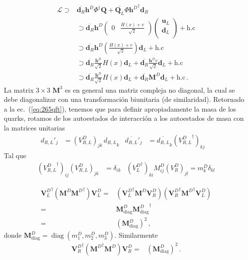 \begin{frame}
\begin{align}
  \mathcal{L}\supset&\overline{\mathbf{d}_R} \mathbf{h}^D \Phi^\dagger \mathbf{Q}+\overline{\mathbf{Q}_L}\Phi{\mathbf{h}^{D}}^\dagger  \mathbf{d}_R\nonumber\\
  &\supset\overline{\mathbf{d}_R} \mathbf{h}^D
  \begin{pmatrix}
    0 &
    \frac{H(x)+v}{\sqrt{2}}
  \end{pmatrix}
  \begin{pmatrix}
    \mathbf{u}_L\\
    \mathbf{d}_L\\
  \end{pmatrix}
  +\text{h.c}\nonumber\\
  &\supset\overline{\mathbf{d}_R} \mathbf{h}^D
  \left(\frac{H(x)+v}{\sqrt{2}}\right)\mathbf{d}_L
  +\text{h.c}\nonumber\\
  &\supset\overline{\mathbf{d}_R} \frac{\mathbf{h}^D}{\sqrt{2}}H(x)\mathbf{d}_L
  +\overline{\mathbf{d}_R} \frac{\mathbf{h}^Dv}{\sqrt{2}}\mathbf{d}_L
      +\text{h.c}\nonumber\\
  &\supset\overline{\mathbf{d}_R} \frac{\mathbf{h}^D}{\sqrt{2}}H(x)\mathbf{d}_L
  +\overline{\mathbf{d}_R} \mathbf{M}^D\mathbf{d}_L
      +\text{h.c}\,.
\end{align}
La matrix $3\times 3$ $\mathbf{M}^3$ es en general una matriz compleja no diagonal, la cual se debe diagonalizar con una transformación biunitaria (de similaridad).
Retornado a la ec.~(\ref{eq:265qft}), tenemos que para definir apropiadamente la masa de los quarks, rotamos de los autoestados de interacción a los autoestados de masa con la matrices unitarias
\begin{align}
  \label{eq:229qft}
  {d_{R,L}}'_j&=(V^D_{R,L})_{jk}\, {d_{R,L}}_k&   \overline{d_{R,L}}'_j&=\overline{d_{R,L}}_k({V^D_{R,L}}^\dagger)_{kj}\,&
\end{align}
Tal que
\begin{align}
  ({V^D_{R,L}}^\dagger)_{ij}(V^D_{R,L})_{jk}&=\delta_{ik}& ({V^D_L}^\dagger)_{ki}M^D_{ij}(V^D_R)_{jl}=m^D_k\delta_{kl}
\end{align}

\begin{align}
 {\mathbf{V}_L^D}^\dagger \left(\mathbf{M}^D{\mathbf{M}^D}^\dagger\right)\mathbf{V}_L^D=&
 \left({\mathbf{V}_L^D}^\dagger \mathbf{M}^D\mathbf{V}_R^D\right)\left({\mathbf{V}_R^D}^\dagger{\mathbf{M}^D}^\dagger\mathbf{V}_L^D\right)\nonumber\\
 =& \mathbf{M}^D_{\text{diag}}{\mathbf{M}^D_{\text{diag}}}^\dagger\nonumber\\
 =& \left({\mathbf{M}^D_{\text{diag}}}\right)^2\,,
\end{align}
donde $\mathbf{M}^D_{\text{diag}}=\operatorname{diag}(m_1^D,m_2^D,m_3^D)$. Similarmente
\begin{align}
  {\mathbf{V}_R^D}^\dagger \left({\mathbf{M}^D}^\dagger\mathbf{M}^D\right)\mathbf{V}_R^D=& \left({\mathbf{M}^D_{\text{diag}}}\right)^2\,.
\end{align}


\end{frame}
